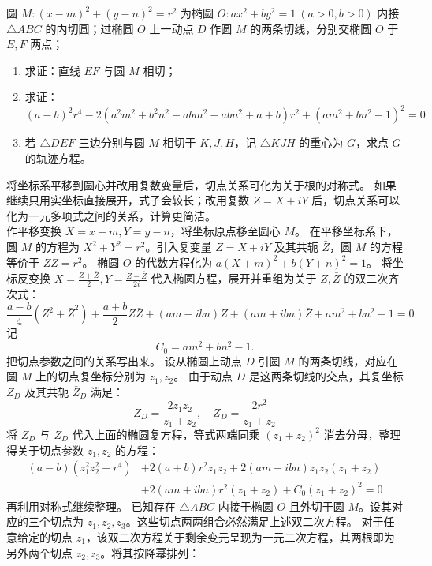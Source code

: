 \begin{example}
圆 \(M: (x - m)^2 + (y - n)^2 = r^2\) 为椭圆 \(O: ax^2 + by^2 = 1\ (a > 0, b > 0)\) 内接 \(\triangle ABC\) 的内切圆；过椭圆 \(O\) 上一动点 \(D\) 作圆 \(M\) 的两条切线，分别交椭圆 \(O\) 于 \(E, F\) 两点；
\begin{enumerate}
\item 求证：直线 \(EF\) 与圆 \(M\) 相切；
\item 求证：\[(a - b)^2 r^4 - 2(a^2 m^2 + b^2 n^2 - abm^2 - abn^2 + a + b) r^2 + (am^2 + bn^2 - 1)^2 = 0\]
\item 若 \(\triangle DEF\) 三边分别与圆 \(M\) 相切于 \(K, J, H\)，记 \(\triangle KJH\) 的重心为 \(G\)，求点 \(G\) 的轨迹方程。
\end{enumerate}
\end{example}
\begin{solution}
将坐标系平移到圆心并改用复数变量后，切点关系可化为关于根的对称式。
如果继续只用实坐标直接展开，式子会较长；改用复数 $Z=X+iY$ 后，切点关系可以化为一元多项式之间的关系，计算更简洁。\\
作平移变换 $X = x - m, Y = y - n$，将坐标原点移至圆心 $M$。
在平移坐标系下，圆 $M$ 的方程为 $X^2 + Y^2 = r^2$。引入复变量 $Z = X + iY$ 及其共轭 $\bar{Z}$，圆 $M$ 的方程等价于 $Z\bar{Z} = r^2$。
椭圆 $O$ 的代数方程化为 $a(X+m)^2 + b(Y+n)^2 = 1$。
将坐标反变换 $X = \frac{Z+\bar{Z}}{2}, Y = \frac{Z-\bar{Z}}{2i}$ 代入椭圆方程，展开并重组为关于 $Z,\bar{Z}$ 的双二次齐次式：
\[ \frac{a-b}{4}(Z^2+\bar{Z}^2) + \frac{a+b}{2}Z\bar{Z} + (am-ibn)Z + (am+ibn)\bar{Z} + am^2+bn^2-1 = 0 \]
记
$$ C_0 = am^2+bn^2-1. $$
把切点参数之间的关系写出来。
设从椭圆上动点 $D$ 引圆 $M$ 的两条切线，对应在圆 $M$ 上的切点复坐标分别为 $z_1, z_2$。
由于动点 $D$ 是这两条切线的交点，其复坐标 $Z_D$ 及其共轭 $\bar{Z}_D$ 满足：
\[ Z_D = \frac{2z_1 z_2}{z_1 + z_2}, \quad \bar{Z}_D = \frac{2r^2}{z_1 + z_2} \]
将 $Z_D$ 与 $\bar{Z}_D$ 代入上面的椭圆复方程，等式两端同乘 $(z_1+z_2)^2$ 消去分母，整理得关于切点参数 $z_1, z_2$ 的方程：
\begin{align*}
(a-b)(z_1^2 z_2^2 + r^4) &+ 2(a+b)r^2 z_1 z_2 + 2(am-ibn)z_1 z_2(z_1+z_2) \\
&+ 2(am+ibn)r^2(z_1+z_2) + C_0(z_1+z_2)^2 = 0
\end{align*}
再利用对称式继续整理。
已知存在 $\triangle ABC$ 内接于椭圆 $O$ 且外切于圆 $M$。设其对应的三个切点为 $z_1, z_2, z_3$。这些切点两两组合必然满足上述双二次方程。
对于任意给定的切点 $z_1$，该双二次方程关于剩余变元呈现为一元二次方程，其两根即为另外两个切点 $z_2, z_3$。将其按降幂排列：
\begin{align*}

\end{align*}
\end{solution}
